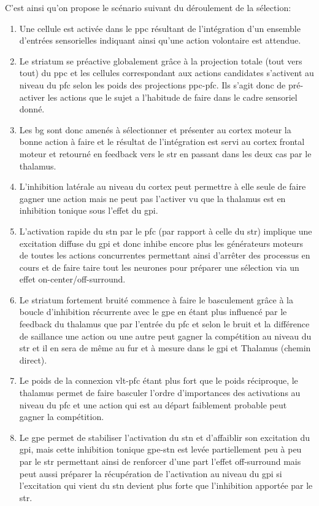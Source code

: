 C'est ainsi qu'on propose le scénario suivant du déroulement de la sélection:
\begin {enumerate}
\item Une cellule est activée dans le \gls{ppc} résultant de l'intégration d'un ensemble d'entrées sensorielles indiquant ainsi qu'une action volontaire est attendue.
\item Le striatum se préactive globalement grâce à la projection totale (tout vers tout) du \gls{ppc} et les cellules correspondant aux actions candidates s'activent au niveau du \gls{pfc} selon les poids des projections \gls{ppc}-\gls{pfc}. Ils s'agit donc de pré-activer les actions que le sujet a l'habitude de faire dans le cadre sensoriel donné.
\item Les \gls{bg} sont donc amenés à sélectionner et présenter au cortex moteur la bonne action à faire et le résultat de l'intégration est servi au cortex frontal moteur et retourné en feedback vers le \gls{str} en passant dans les deux cas par le thalamus.
\item L'inhibition latérale au niveau du cortex peut permettre à elle seule de faire gagner une action mais ne peut pas l'activer vu que la thalamus est en inhibition tonique sous l'effet du \gls{gpi}.  
\item L'activation rapide du \gls{stn} par le \gls{pfc} (par rapport à celle du \gls{str}) implique une excitation diffuse du \gls{gpi} et donc inhibe encore plus les générateurs moteurs de toutes les actions concurrentes permettant ainsi d'arrêter des processus en cours et de faire taire tout les  neurones pour préparer une sélection via un effet on-center/off-surround. 
\item Le striatum fortement bruité commence à faire le basculement grâce à la boucle d'inhibition récurrente avec le \gls{gpe} en étant plus influencé par le feedback du thalamus que par l'entrée du \gls{pfc} et selon le bruit et la différence de saillance une action ou une autre peut gagner la compétition au niveau du \gls{str} et il en sera de même au fur et à mesure dans le \gls{gpi} et Thalamus (chemin direct).
\item Le poids de la connexion \gls{vlt}-\gls{pfc} étant plus fort que le poids réciproque, le thalamus permet de faire basculer l'ordre d'importances des activations au niveau du \gls{pfc} et une action qui est au départ faiblement probable peut gagner la compétition.
\item Le \gls{gpe} permet de stabiliser l'activation du \gls{stn} et d'affaiblir son excitation du \gls{gpi}, mais cette inhibition tonique  \gls{gpe}-\gls{stn} est levée partiellement peu à peu par le \gls{str} permettant ainsi de renforcer d'une part l'effet off-surround  mais peut aussi préparer la récupération de l'activation au niveau du \gls{gpi} si l'excitation qui vient du \gls{stn} devient plus forte que l'inhibition apportée par le \gls{str}.
\end {enumerate}

